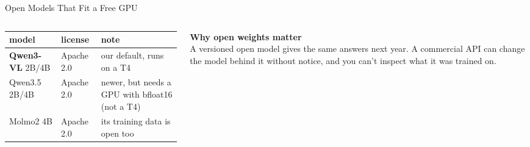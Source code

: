 \begin{frame}{Open Models That Fit a Free GPU}
\begin{columns}[T]
\begin{column}{0.58\textwidth}
{\footnotesize
\begin{tabular}{@{}>{\raggedright\arraybackslash}p{2.6cm}>{\raggedright\arraybackslash}p{1.6cm}>{\raggedright\arraybackslash}p{3.0cm}@{}}
\toprule
model & license & note \\
\midrule
\textbf{Qwen3-VL} 2B/4B & Apache 2.0 & our default, runs on a T4 \\
Qwen3.5 2B/4B & Apache 2.0 & newer, but needs a GPU with bfloat16 (not a T4) \\
Molmo2 4B & Apache 2.0 & its training data is open too \\
\bottomrule
\end{tabular}}

\vspace{0.2cm}
\end{column}
\begin{column}{0.38\textwidth}
\begin{graybox}
\textbf{Why open weights matter}\\
A versioned open model gives the same answers next year. A commercial API can change the model
behind it without notice, and you can't inspect what it was trained on.
\end{graybox}
\end{column}
\end{columns}
\end{frame}

